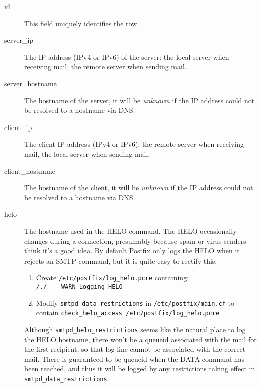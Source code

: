 \documentclass[a4paper,12pt,draft]{article}
\begin{document}
\begin{description}

    \item [id] This field uniquely identifies the row.

    \item [server\_ip] The IP address (IPv4 or IPv6) of the server: the
        local server when receiving mail, the remote server when sending
        mail.

    \item [server\_hostname] The hostname of the server, it will be
        \textit{unknown\/} if the IP address could not be resolved to a
        hostname via DNS\@.

    \item [client\_ip] The client IP address (IPv4 or IPv6): the remote
        server when receiving mail, the local server when sending mail.

    \item [client\_hostname] The hostname of the client, it will be
        \textit{unknown\/} if the IP address could not be resolved to a
        hostname via DNS\@.

    \item [helo] The hostname used in the HELO command.  The HELO
        occasionally changes during a connection, presumably because spam
        or virus senders think it's a good idea.  By default Postfix only
        logs the HELO when it rejects an SMTP command, but it is quite easy
        to rectify this: 

\label{logging helo}

        \begin{enumerate}

            \item Create \texttt{/etc/postfix/log\_helo.pcre}
                containing:\newline
                \hspace*{2em}\texttt{/./~~~~WARN~Logging~HELO}

            \item Modify \texttt{smtpd\_data\_restrictions} in
                \texttt{/etc/postfix/main.cf} to contain\newline
                \hspace*{2em}\texttt{check\_helo\_access~/etc/postfix/log\_helo.pcre}

        \end{enumerate}

        Although \texttt{smtpd\_helo\_restrictions} seems like the natural
        place to log the HELO hostname, there won't be a queueid associated
        with the mail for the first recipient, so that log line cannot be
        associated with the correct mail.  There is guaranteed to be
        queueid when the DATA command has been reached, and thus it will be
        logged by any restrictions taking effect in
        \texttt{smtpd\_data\_restrictions}.


\end{description}
\end{document}
